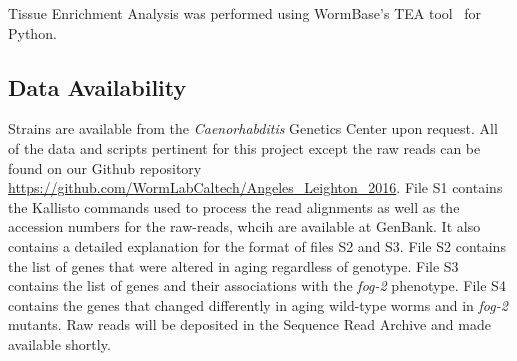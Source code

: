 \documentclass[10pt,letterpaper,twocolumn]{article}
\newcommand{\fog}{\emph{\mbox{fog-2}}}
\begin{document}
Tissue Enrichment Analysis was performed using WormBase's TEA
tool~\cite{Angeles-Albores2016} for Python.


%


\subsection*{Data Availability}
\label{sb:data_availability}
Strains are available from the \emph{Caenorhabditis} Genetics Center upon
request. All of the data and scripts pertinent for this project except the raw
reads can be found on our Github repository
\url{https://github.com/WormLabCaltech/Angeles_Leighton_2016}. File S1 contains
the Kallisto commands used to process the read alignments as well as the
accession numbers for the raw-reads, whcih are available at GenBank. It also
contains a detailed explanation for the format of files S2 and S3. File S2
contains the list of genes that were altered in aging regardless of genotype.
File S3 contains the list of genes and their associations with the \fog{}
phenotype. File S4 contains the genes that changed differently in aging
wild-type worms and in \fog{} mutants. Raw reads will be deposited in the
Sequence Read Archive and made available shortly.
\end{document}
